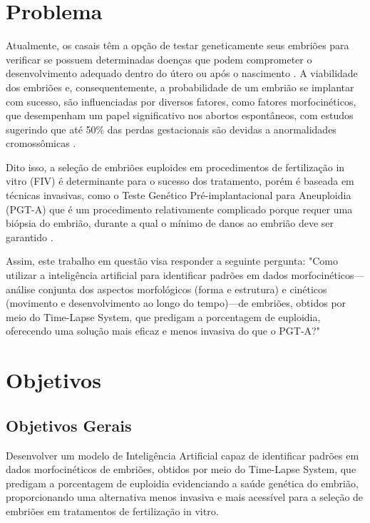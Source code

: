 \section{Problema}

Atualmente, os casais têm a opção de testar geneticamente seus embriões para verificar se possuem determinadas doenças que podem comprometer o desenvolvimento adequado dentro do útero ou após o nascimento \cite{scienceofbiogenetics2024}. A viabilidade dos embriões e, consequentemente, a probabilidade de um embrião se implantar com sucesso, são influenciadas por diversos fatores, como fatores morfocinéticos, que desempenham um papel significativo nos abortos espontâneos, com estudos sugerindo que até 50\% das perdas gestacionais são devidas a anormalidades cromossômicas \cite{scienceofbiogenetics2024}. 

Dito isso, a seleção de embriões euploides em procedimentos de fertilização in vitro (FIV) é determinante para o sucesso dos tratamento, porém é baseada em técnicas invasivas, como o Teste Genético Pré-implantacional para Aneuploidia (PGT-A) que é um procedimento relativamente complicado porque requer uma biópsia do embrião, durante a qual o mínimo de danos ao embrião deve ser garantido \cite{yang2024}. 

Assim, este trabalho em questão visa responder a seguinte pergunta: "Como utilizar a inteligência artificial para identificar padrões em dados morfocinéticos—análise conjunta dos aspectos morfológicos (forma e estrutura) e cinéticos (movimento e desenvolvimento ao longo do tempo)—de embriões, obtidos por meio do Time-Lapse System, que predigam a porcentagem de euploidia, oferecendo uma solução mais eficaz e menos invasiva do que o PGT-A?"


\section{Objetivos}

\subsection{Objetivos Gerais}
Desenvolver um modelo de Inteligência Artificial capaz de identificar padrões em dados morfocinéticos de embriões, obtidos por meio do Time-Lapse System, que predigam a porcentagem de euploidia evidenciando a saúde genética do embrião, proporcionando uma alternativa menos invasiva e mais acessível para a seleção de embriões em tratamentos de fertilização in vitro.

